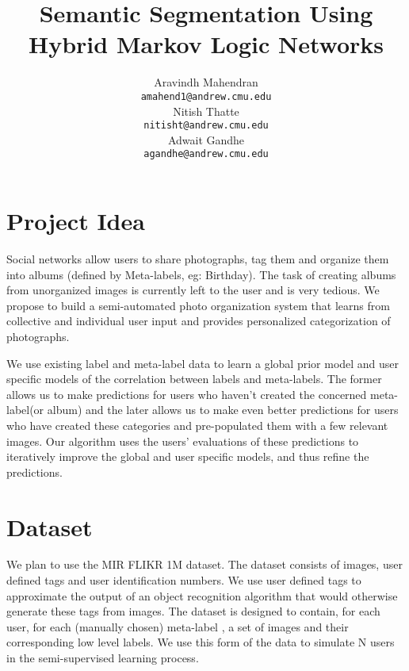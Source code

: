 \documentclass{article} %
\title{	}
\title{Semantic Segmentation Using Hybrid Markov Logic Networks}
\author{
Aravindh Mahendran \\
\texttt{amahend1@andrew.cmu.edu} \\ 
\And
Nitish Thatte \\
\texttt{nitisht@andrew.cmu.edu} \\
\AND
Adwait Gandhe \\
\texttt{agandhe@andrew.cmu.edu} \\
}
\begin{document}
\maketitle
\vspace{-0.5in}
\section{Project Idea}
\vspace{-0.125in}
\label{sec:projidea}
Social networks allow users to share photographs, tag them and organize them into albums (defined by Meta-labels, eg: Birthday). The task of creating albums from unorganized images is currently left to the user and is very tedious. We propose to build a semi-automated photo organization system that learns from collective and individual user input and provides personalized categorization of photographs. 

We use existing label and meta-label data to learn a global prior model and user specific models of the correlation between labels and meta-labels. The former allows us to make predictions for users who haven't created the concerned meta-label(or album) and the later allows us to make even better predictions for users who have created these categories and pre-populated them with a few relevant images. Our algorithm uses the users' evaluations of these predictions to iteratively improve the global and user specific models, and thus refine the predictions.
\vspace{-0.125in}
\section{Dataset}
\vspace{-0.125in}
We plan to use the MIR FLIKR 1M dataset. The dataset consists of images, user defined tags and user identification numbers. 
We use user defined tags to approximate the output of an object recognition algorithm that would otherwise generate these tags from images.
The dataset is designed to contain, for each user, for each (manually chosen) meta-label , a set of images and their corresponding low level labels. We use this form of the data to simulate N users in the semi-supervised learning process. 
%
\vspace{-0.125in}
\end{document}
